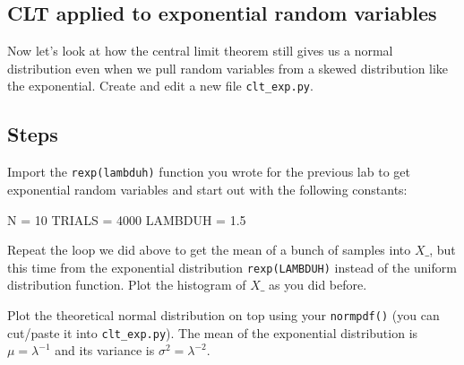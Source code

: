 \begin{fullwidth}

\section{CLT applied to exponential random variables}

Now let's look at how the central limit theorem still gives us a normal distribution even when we pull random variables from a skewed distribution like the exponential. Create and edit a new file {\tt clt\_exp.py}.

\subsection{Steps}

\step Import the {\tt rexp(lambduh)} function you wrote for the previous lab to get exponential random variables and start out with the following constants:

\begin{pyverbatim}
N = 10
TRIALS = 4000
LAMBDUH = 1.5
\end{pyverbatim}

\step Repeat the loop we did above to get the mean of a bunch of samples into $X\_$, but this time from the exponential distribution {\tt rexp(LAMBDUH)} instead of the uniform distribution function. Plot the histogram of $X\_$ as you did before.

\step Plot the theoretical normal distribution on top using your {\tt normpdf()} (you can cut/paste it into {\tt clt\_exp.py}). The mean of the exponential distribution is $\mu = \lambda^{-1}$ and its variance is $\sigma^2 = \lambda^{-2}$.


\end{fullwidth}
